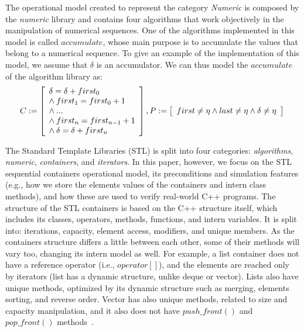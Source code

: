 \documentclass[a4paper]{llncs}
\begin{document}
{The operational model created to represent the category \textit{Numeric} is
composed by the \textit{numeric} library and contains four algorithms that work
objectively in the manipulation of numerical sequences. One of the algorithms
implemented in this model is called $accumulate$, whose main purpose is
to accumulate the values that belong to a numerical sequence. To give an example
of the implementation of this model, we assume that $\delta$ is an accumulator.
We can thus model the $accumulate$ of the algorithm library as:
%
\begin{equation}
\label{quantifier-free-formulae-accumulate}
C := \left [ \begin{array}{ll}
            \delta = \delta + first_{0} \\
            \wedge \:first_{1} = first_{0} +1 \\
            \wedge \:... \\
            \wedge \:first_{n} = first_{n-1} +1 \\
            \wedge \:\delta = \delta + first_{n} \\
              \end{array} \right ],  \\
P := \left [ \begin{array}{ll}
            first \neq \eta \wedge last \neq \eta \wedge \delta \neq \eta \\
              \end{array} \right ]  \\
\end{equation}

}

The Standard Template Libraries (STL) is split into
four categories: \textit{algorithms}, \textit{numeric},
\textit{containers}, and \textit{iterators}.
In this paper, however, we focus on the STL sequential
containers operational model, its preconditions and
simulation features (e.g., how we store the elements
values of the containers and intern class methods),
and how these are used to verify real-world C++ programs.
The structure of the STL containers is based on the
C++ structure itself, which includes its classes, operators,
methods, functions, and intern variables. It is split into:
iterations, capacity, element access, modifiers, and unique
members. As the containers structure differs a little
between each other, some of their methods will vary too,
changing its intern model as well. For example, a list container
does not have a reference operator (i.e., $operator\left[\right]$), and the elements
are reached only by iterators (list has a dynamic structure,
unlike deque or vector). Lists also have unique methods, optimized by its
dynamic structure such as merging, elements sorting, and reverse order.
Vector has also unique methods, related to size and capacity manipulation,
and it also does not have $push\_front\left(\right)$
and $pop\_front\left(\right)$ methods~\cite{CppReference12}.
\end{document}
